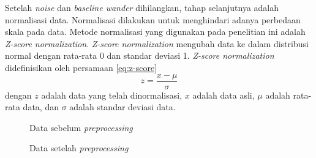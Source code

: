 Setelah \textit{noise} dan \textit{baseline wander} dihilangkan, tahap selanjutnya adalah normalisasi data.
Normalisasi dilakukan untuk menghindari adanya perbedaan skala pada data.
Metode normalisasi yang digunakan pada penelitian ini adalah \textit{Z-score normalization}.
\textit{Z-score normalization} mengubah data ke dalam distribusi normal dengan rata-rata 0 dan standar deviasi 1.
\textit{Z-score normalization} didefinisikan oleh persamaan \ref{eq:z-score}
\begin{equation}
		z = \frac{x - \mu}{\sigma}
		\label{eq:z-score}
\end{equation}
dengan $z$ adalah data yang telah dinormalisasi, $x$ adalah data asli, $\mu$ adalah rata-rata data, dan $\sigma$ adalah standar deviasi data.


\begin{figure}[H]
    \centering
	\caption{Data sebelum \textit{preprocessing}}
	\label{fig:sebelum-prep}
\end{figure}

\begin{figure}[H]
  \centering
  \caption{Data setelah \textit{preprocessing}}
  \label{fig:setelah-prep}
\end{figure}


